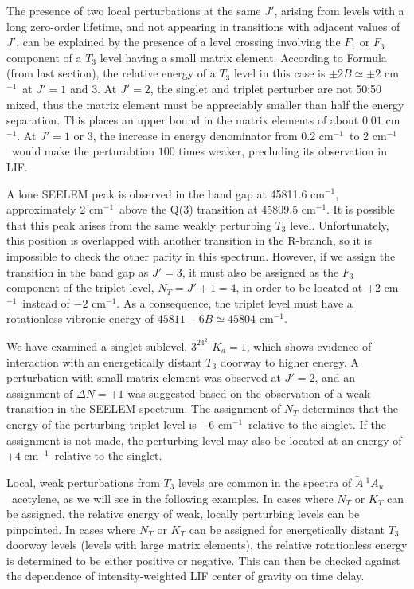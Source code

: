 \documentclass[12pt]{mitthesis}
\newcommand{\rcm}{cm$^{-1}$}
\newcommand{\astate}{$
  \tilde{A} \: ^1\!A_u
  $}
\newcommand{\Ka}[1]{$K_a\!\!=\!#1$}
\begin{document}
The presence of two local perturbations at the same $J'$, arising from
levels with a long zero-order lifetime, and not appearing in
transitions with adjacent values of $J'$, can be explained by the
presence of a level crossing involving the $F_1$ or $F_3$ component of
a $T_3$ level having a small matrix element.  According to Formula
(from last section), the relative energy of a $T_3$ level in this case
is $\pm 2B \simeq \pm 2$ \rcm\ at $J'=1$ and $3$.  At $J'=2$, the singlet
and triplet perturber are not 50:50 mixed, thus the matrix element
must be appreciably smaller than half the energy separation.  This
places an upper bound in the matrix elements of about $0.01$ \rcm.  At
$J'=1$ or $3$, the increase in energy denominator from 0.2 \rcm\ to 2
\rcm\ would make the perturabtion $100$ times weaker, precluding its
observation in LIF.

A lone SEELEM peak is observed in the band gap at 45811.6 \rcm,
approximately 2 \rcm\ above the Q(3) transition at 45809.5 \rcm.  It
is possible that this peak arises from the same weakly perturbing
$T_3$ level.  Unfortunately, this position is overlapped with another
transition in the R-branch, so it is impossible to check the other
parity in this spectrum.  However, if we assign the transition in the
band gap as $J'=3$, it must also be assigned as the $F_3$ component of
the triplet level, $N_T=J'+1=4$, in order to be located at $+2$ \rcm\
instead of $-2$ \rcm.  As a consequence, the triplet level must have a
rotationless vibronic energy of $45811 - 6B \simeq 45804$ \rcm.

We have examined a singlet sublevel, $3^24^2$ \Ka{1}, which shows
evidence of interaction with an energetically distant $T_3$ doorway to
higher energy.  A perturbation with small matrix element was observed
at $J'=2$, and an assignment of $\Delta N=+1$ was suggested based on
the observation of a weak transition in the SEELEM spectrum.  The
assignment of $N_T$ determines that the energy of the perturbing
triplet level is $-6$ \rcm\ relative to the singlet. If the assignment
is not made, the perturbing level may also be located at an energy of
$+4$ \rcm\ relative to the singlet.

Local, weak perturbations from $T_3$ levels are common in the spectra
of \astate\ acetylene, as we will see in the following examples.  In
cases where $N_T$ or $K_T$ can be assigned, the relative energy of
weak, locally perturbing levels can be pinpointed.  In cases where
$N_T$ or $K_T$ can be assigned for energetically distant $T_3$ doorway
levels (levels with large matrix elements), the relative rotationless
energy is determined to be either positive or negative.  This can then
be checked against the dependence of intensity-weighted LIF center of
gravity on time delay.
\end{document}
